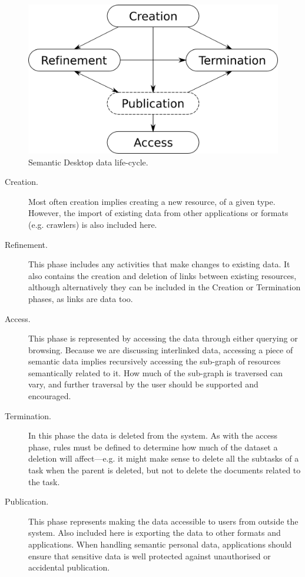 \begin{figure}[htb]
 \includegraphics[width=0.7\linewidth]{chapters/core/img/lifecycle}
\caption{Semantic Desktop data life-cycle.}
\label{fig:datalifecycle}
\end{figure} 

\begin{description}
 \item[Creation.] Most often creation implies creating a new resource, of a given type. However, the import of existing data from other applications or formats (e.g. crawlers) is also included here.
 \item[Refinement.] This phase includes any activities that make changes to existing data. It also contains the creation and deletion of links between existing resources, although alternatively they can be included in the Creation or Termination phases, as links are data too. 
 \item[Access.] This phase is represented by accessing the data through either querying or browsing. Because we are discussing interlinked data, accessing a piece of semantic data implies recursively accessing the sub-graph of resources semantically related to it. How much of the sub-graph is traversed can vary, and further traversal by the user should be supported and encouraged. 
 \item[Termination.] In this phase the data is deleted from the system. As with the access phase, rules must be defined to determine how much of the dataset a deletion will affect---e.g. it might make sense to delete all the subtasks of a task when the parent is deleted, but not to delete the documents related to the task.
 \item[Publication.] This phase represents making the data accessible to users from outside the system. Also included here is exporting the data to other formats and applications. When handling semantic personal data, applications should ensure that sensitive data is well protected against unauthorised or accidental publication. 
\end{description}

